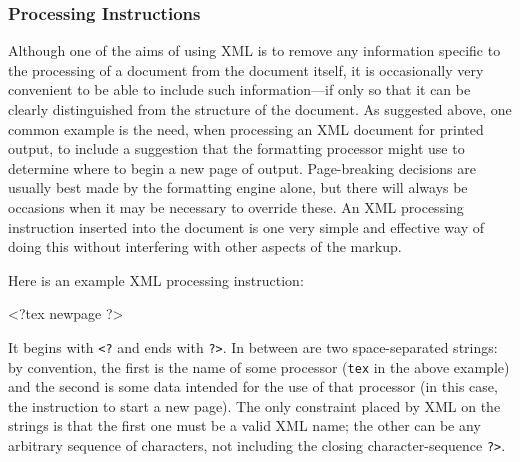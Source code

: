 \subsubsection[{Processing Instructions}]{Processing Instructions}\label{SG-pi}\par
Although one of the aims of using XML is to remove any information specific to the processing of a document from the document itself, it is occasionally very convenient to be able to include such information—if only so that it can be clearly distinguished from the structure of the document. As suggested above, one common example is the need, when processing an XML document for printed output, to include a suggestion that the formatting processor might use to determine where to begin a new page of output. Page-breaking decisions are usually best made by the formatting engine alone, but there will always be occasions when it may be necessary to override these. An XML processing instruction inserted into the document is one very simple and effective way of doing this without interfering with other aspects of the markup.\par
Here is an example XML processing instruction: \par\hfill\bgroup\exampleFont\vskip 10pt\begin{shaded}
\obeyspaces <?tex ⃥newpage ?>\end{shaded}
\par\egroup 
 It begins with \texttt{<?} and ends with \texttt{?>}. In between are two space-separated strings: by convention, the first is the name of some processor (\texttt{tex} in the above example) and the second is some data intended for the use of that processor (in this case, the instruction to start a new page). The only constraint placed by XML on the strings is that the first one must be a valid XML name; the other can be any arbitrary sequence of characters, not including the closing character-sequence \texttt{?>}.
